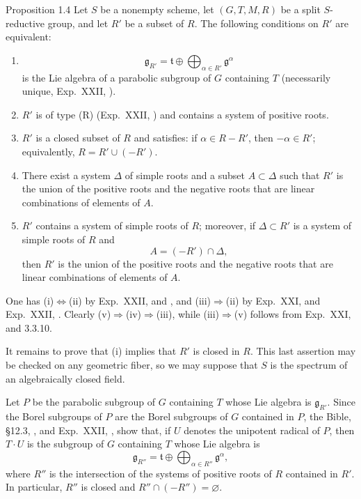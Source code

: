 \begin{sgastatement}{Proposition 1.4}
Let \(S\) be a nonempty scheme, let \((G,T,M,R)\) be a split
\(S\)-reductive group, and let \(R'\) be a subset of \(R\).  The following
conditions on \(R'\) are equivalent:
\begin{enumerate}[label=\textup{(\roman*)}]
\item
\[
 \mathfrak g_{R'}=\mathfrak t\oplus
 \bigoplus_{\alpha\in R'}\mathfrak g^\alpha
\]
is the Lie algebra of a parabolic subgroup of \(G\) containing \(T\)
\textup{(necessarily unique, Exp.\ XXII, )}.
\item \(R'\) is of type \textup{(R)} \textup{(Exp.\ XXII, )} and
contains a system of positive roots.
\item \(R'\) is a closed subset of \(R\) and satisfies: if
\(\alpha\in R-R'\), then \(-\alpha\in R'\); equivalently,
\(R=R'\cup(-R')\).
\item There exist a system \(\Delta\) of simple roots and a subset
\(A\subset\Delta\) such that \(R'\) is the union of the positive roots and
the negative roots that are linear combinations of elements of \(A\).
\item{} \(R'\) contains a system of simple roots of \(R\); moreover, if
\(\Delta\subset R'\) is a system of simple roots of \(R\) and
\[
 A=(-R')\cap\Delta,
\]
then \(R'\) is the union of the positive roots and the negative roots that
are linear combinations of elements of \(A\).
\end{enumerate}
\end{sgastatement}

One has (i)\(\Leftrightarrow\)(ii) by Exp.\ XXII,  and ,
and (iii)\(\Rightarrow\)(ii) by Exp.\ XXI,  and Exp.\ XXII, .
Clearly (v)\(\Rightarrow\)(iv)\(\Rightarrow\)(iii), while
(iii)\(\Rightarrow\)(v) follows from Exp.\ XXI,  and 3.3.10.

It remains to prove that (i) implies that \(R'\) is closed in \(R\).  This
last assertion may be checked on any geometric fiber, so we may suppose that
\(S\) is the spectrum of an algebraically closed field.

Let \(P\) be the parabolic subgroup of \(G\) containing \(T\) whose Lie
algebra is \(\mathfrak g_{R'}\).  Since the Borel subgroups of \(P\) are the
Borel subgroups of \(G\) contained in \(P\), the Bible, §12.3, ,
and Exp.\ XXII, , show that, if \(U\) denotes the unipotent radical
of \(P\), then \(T\cdot U\) is the subgroup of \(G\) containing \(T\) whose
Lie algebra is
\[
 \mathfrak g_{R''}=\mathfrak t\oplus
 \bigoplus_{\alpha\in R''}\mathfrak g^\alpha,
\]
where \(R''\) is the intersection of the systems of positive roots of \(R\)
contained in \(R'\).  In particular, \(R''\) is closed and
\(R''\cap(-R'')=\varnothing\).

